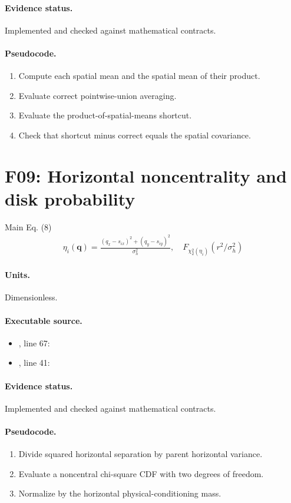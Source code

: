 \documentclass[10pt]{article}
\begin{document}
\paragraph{Evidence status.} Implemented and checked against mathematical contracts.
\paragraph{Pseudocode.}
\begin{enumerate}[leftmargin=*]
\item Compute each spatial mean and the spatial mean of their product.
\item Evaluate correct pointwise-union averaging.
\item Evaluate the product-of-spatial-means shortcut.
\item Check that shortcut minus correct equals the spatial covariance.
\end{enumerate}
\newpage
\section*{F09: Horizontal noncentrality and disk probability}
Main Eq. (8)
\begin{gather*}\eta_i(\mathbf q)=\frac{(q_x-s_{ix})^2+(q_y-s_{iy})^2}{\sigma_h^2},\quad F_{\chi^2_2(\eta_i)}(r^2/\sigma_h^2)\end{gather*}
\paragraph{Units.} Dimensionless.
\paragraph{Executable source.}
\begin{itemize}[leftmargin=*]
\item {}, line 67: 
\item {}, line 41: 
\end{itemize}
\paragraph{Evidence status.} Implemented and checked against mathematical contracts.
\paragraph{Pseudocode.}
\begin{enumerate}[leftmargin=*]
\item Divide squared horizontal separation by parent horizontal variance.
\item Evaluate a noncentral chi-square CDF with two degrees of freedom.
\item Normalize by the horizontal physical-conditioning mass.
\end{enumerate}
\newpage
\end{document}
